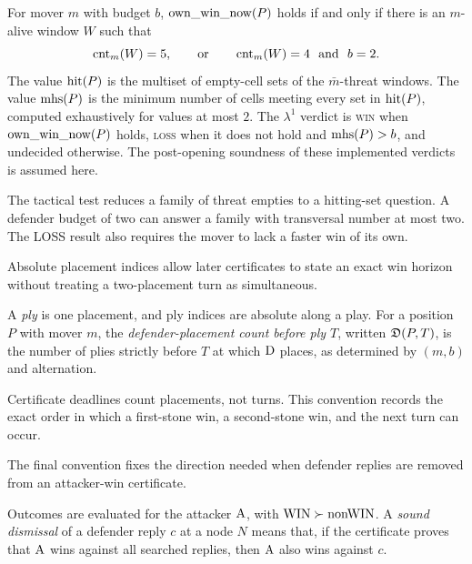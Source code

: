 \begin{definition}
\label{def:D6}
For mover $m$ with budget $b$, $\operatorname{own\_win\_now}(P)$ holds if and only if there is
an $m$-alive window $W$ such that
\[
  \operatorname{cnt}_m(W)=5,
  \qquad\text{or}\qquad
  \operatorname{cnt}_m(W)=4\ \text{ and }\ b=2.
\]
The value $\operatorname{hit}(P)$ is the multiset of empty-cell sets of the
$\bar m$-threat windows.  The value $\operatorname{mhs}(P)$ is the minimum number of cells
meeting every set in $\operatorname{hit}(P)$, computed exhaustively for values at most $2$.
The $\lambda^1$ verdict is \textsc{win} when $\operatorname{own\_win\_now}(P)$ holds,
\textsc{loss} when it does not hold and $\operatorname{mhs}(P)>b$, and undecided otherwise.
The post-opening soundness of these implemented verdicts is assumed here.
\end{definition}

\begin{plainterms}
The tactical test reduces a family of threat empties to a hitting-set
question.  A defender budget of two can answer a family with transversal
number at most two.  The LOSS result also requires the mover to lack a faster
win of its own.
\end{plainterms}

Absolute placement indices allow later certificates to state an exact win
horizon without treating a two-placement turn as simultaneous.

\begin{definition}
\label{def:D7}
A \emph{ply} is one placement, and ply indices are absolute along a play.  For
a position $P$ with mover $m$, the \emph{defender-placement count before ply
$T$}, written $\mathfrak D(P,T)$, is the number of plies strictly before $T$ at
which $\mathrm{D}$ places, as determined by $(m,b)$ and alternation.
\end{definition}

\begin{plainterms}
Certificate deadlines count placements, not turns.  This convention records
the exact order in which a first-stone win, a second-stone win, and the next
turn can occur.
\end{plainterms}

The final convention fixes the direction needed when defender replies are
removed from an attacker-win certificate.

\begin{definition}
\label{def:D8}
Outcomes are evaluated for the attacker $\mathrm{A}$, with
$\mathrm{WIN}\succ\mathrm{nonWIN}$.  A \emph{sound dismissal} of a defender reply
$c$ at a node $N$ means that, if the certificate proves that $\mathrm{A}$ wins against
all searched replies, then $\mathrm{A}$ also wins against $c$.
\end{definition}

